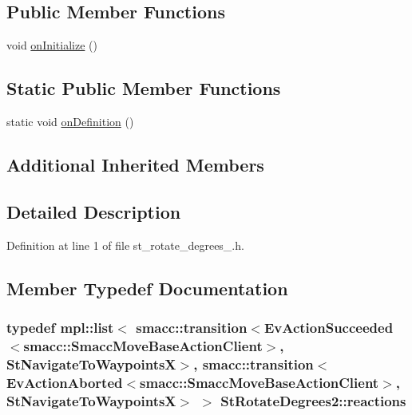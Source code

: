 \subsection*{Public Member Functions}
\begin{DoxyCompactItemize}
\item 
void \hyperlink{structStRotateDegrees2_a6fa87a927ab3eac0fd2f609f66ec355a}{on\+Initialize} ()
\end{DoxyCompactItemize}
\subsection*{Static Public Member Functions}
\begin{DoxyCompactItemize}
\item 
static void \hyperlink{structStRotateDegrees2_af162a3bc8f3893613d0aa592ccebcdc2}{on\+Definition} ()
\end{DoxyCompactItemize}
\subsection*{Additional Inherited Members}


\subsection{Detailed Description}


Definition at line 1 of file st\+\_\+rotate\+\_\+degrees\+\_.\+h.



\subsection{Member Typedef Documentation}
\subsubsection[{\texorpdfstring{reactions}{reactions}}]{\setlength{\rightskip}{0pt plus 5cm}typedef mpl\+::list$<$ {\bf smacc\+::transition}$<$Ev\+Action\+Succeeded$<${\bf smacc\+::\+Smacc\+Move\+Base\+Action\+Client}$>$, {\bf St\+Navigate\+To\+WaypointsX}$>$, {\bf smacc\+::transition}$<$Ev\+Action\+Aborted$<${\bf smacc\+::\+Smacc\+Move\+Base\+Action\+Client}$>$, {\bf St\+Navigate\+To\+WaypointsX}$>$ $>$ {\bf St\+Rotate\+Degrees2\+::reactions}}\hypertarget{structStRotateDegrees2_a2c5670a9c31f858e292a2e44043d6a1f}{}\label{structStRotateDegrees2_a2c5670a9c31f858e292a2e44043d6a1f}


